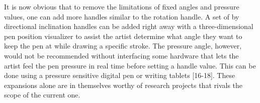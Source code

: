 It is now obvious that to remove the limitations of fixed angles and pressure values, one can add more handles similar to the rotation handle. A set of by directional inclination handles can be added right away with a three-dimensional pen position visualizer to assist the artist determine what angle they want to keep the pen at while drawing a specific stroke. The pressure angle, however, would not be recommended without interfacing some hardware that lets the artist feel the pen pressure in real time before setting a handle value. This can be done using a pressure sensitive digital pen or writing tablets [16-18]. These expansions alone are in themselves worthy of research projects that rivals the scope of the current one.
